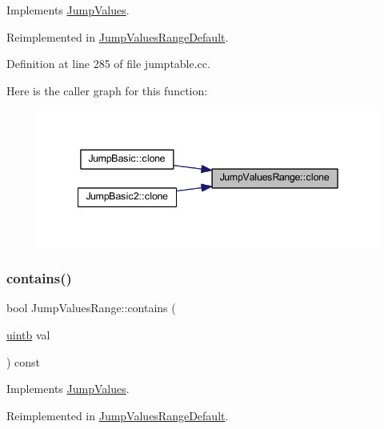 Implements \mbox{\hyperlink{class_jump_values_adfe4b22f78bedc2e90488a820dd86d3e}{Jump\+Values}}.



Reimplemented in \mbox{\hyperlink{class_jump_values_range_default_ac0169c2a1146293eac5fc316411398ba}{Jump\+Values\+Range\+Default}}.



Definition at line 285 of file jumptable.\+cc.

Here is the caller graph for this function\+:
\nopagebreak
\begin{figure}[H]
\begin{center}
\leavevmode
\includegraphics[width=342pt]{class_jump_values_range_a1e22013b45547017b47758fd8901b0ef_icgraph}
\end{center}
\end{figure}
\mbox{\label{class_jump_values_range_ac498609bd6eb43a1b7d1d5bc3ad2152b}} 
\subsubsection{\texorpdfstring{contains()}{contains()}}
{\footnotesize\ttfamily bool Jump\+Values\+Range\+::contains (\begin{DoxyParamCaption}\item[{\mbox{\hyperlink{types_8h_a2db313c5d32a12b01d26ac9b3bca178f}{uintb}}}]{val }\end{DoxyParamCaption}) const\hspace{0.3cm}{\ttfamily [virtual]}}



Implements \mbox{\hyperlink{class_jump_values_a870c42f3098324112496fdb03572cf3a}{Jump\+Values}}.



Reimplemented in \mbox{\hyperlink{class_jump_values_range_default_a6f7f9429f60a706f419d4c834fdf4943}{Jump\+Values\+Range\+Default}}.



